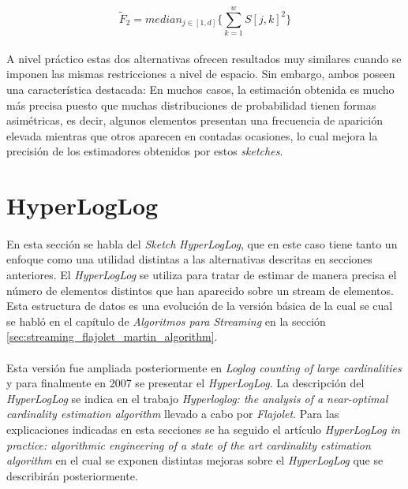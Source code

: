 \documentclass{subfiles}
\begin{document}
      \begin{equation}
      \label{eq:ams_sketch_f2}
        \widetilde{F}_2 = median_{j \in [1,d]}\{\sum_{k=1}^w S[j, k]^2\}
      \end{equation}

      \paragraph{}
      A nivel práctico estas dos alternativas ofrecen resultados muy similares cuando se imponen las mismas restricciones a nivel de espacio. Sin embargo, ambos poseen una característica destacada: En muchos casos, la estimación obtenida es mucho más precisa puesto que muchas distribuciones de probabilidad tienen formas asimétricas, es decir, algunos elementos presentan una frecuencia de aparición elevada mientras que otros aparecen en contadas ocasiones, lo cual mejora la precisión de los estimadores obtenidos por estos \emph{sketches}.

    \section{HyperLogLog}
    \label{sec:hyper_log_log}

      \paragraph{}
      En esta sección se habla del \emph{Sketch} \emph{HyperLogLog}, que en este caso tiene tanto un enfoque como una utilidad distintas a las alternativas descritas en secciones anteriores. El \emph{HyperLogLog} se utiliza para tratar de estimar de manera precisa el número de elementos distintos que han aparecido sobre un stream de elementos. Esta estructura de datos es una evolución de la versión básica de la cual se cual se habló en el capítulo de \emph{Algoritmos para Streaming} en la sección \ref{sec:streaming_flajolet_martin_algorithm}.

      \paragraph{}
      Esta versión fue ampliada posteriormente en \emph{Loglog counting of large cardinalities} \cite{durand2003loglog} y para finalmente en 2007 se presentar el \emph{HyperLogLog}. La descripción del \emph{HyperLogLog} se indica en el trabajo \emph{Hyperloglog: the analysis of a near-optimal cardinality estimation algorithm} \cite{flajolet2007hyperloglog} llevado a cabo por \emph{Flajolet}. Para las explicaciones indicadas en esta secciones se ha seguido el artículo \emph{HyperLogLog in practice: algorithmic engineering of a state of the art cardinality estimation algorithm} \cite{heule2013hyperloglog} en el cual se exponen distintas mejoras sobre el \emph{HyperLogLog} que se describirán posteriormente.
\end{document}
